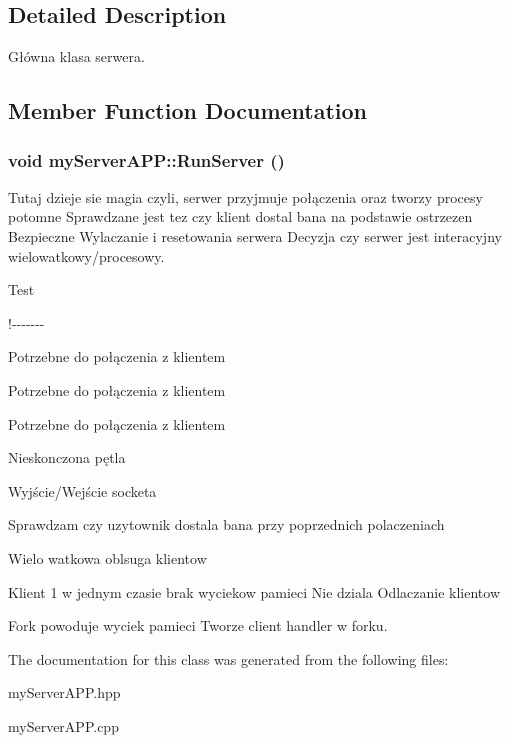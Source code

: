 \subsection{Detailed Description}
Główna klasa serwera. 

\subsection{Member Function Documentation}
\hypertarget{classmyServerAPP_a1683e57c122e19f851e350fc3095caed}{
\subsubsection[{RunServer}]{\setlength{\rightskip}{0pt plus 5cm}void myServerAPP::RunServer ()}}
\label{classmyServerAPP_a1683e57c122e19f851e350fc3095caed}


Tutaj dzieje sie magia czyli, serwer przyjmuje połączenia oraz tworzy procesy potomne Sprawdzane jest tez czy klient dostal bana na podstawie ostrzezen Bezpieczne Wylaczanie i resetowania serwera Decyzja czy serwer jest interacyjny wielowatkowy/procesowy.

Test

!-\/-\/-\/-\/-\/-\/-\/

Potrzebne do połączenia z klientem

Potrzebne do połączenia z klientem

Potrzebne do połączenia z klientem

Nieskonczona pętla

Wyjście/Wejście socketa

Sprawdzam czy uzytownik dostala bana przy poprzednich polaczeniach

Wielo watkowa oblsuga klientow

Klient 1 w jednym czasie brak wyciekow pamieci Nie dziala Odlaczanie klientow

Fork powoduje wyciek pamieci Tworze client handler w forku. 



The documentation for this class was generated from the following files:\begin{DoxyCompactItemize}
\item 
myServerAPP.hpp\item 
myServerAPP.cpp\end{DoxyCompactItemize}
